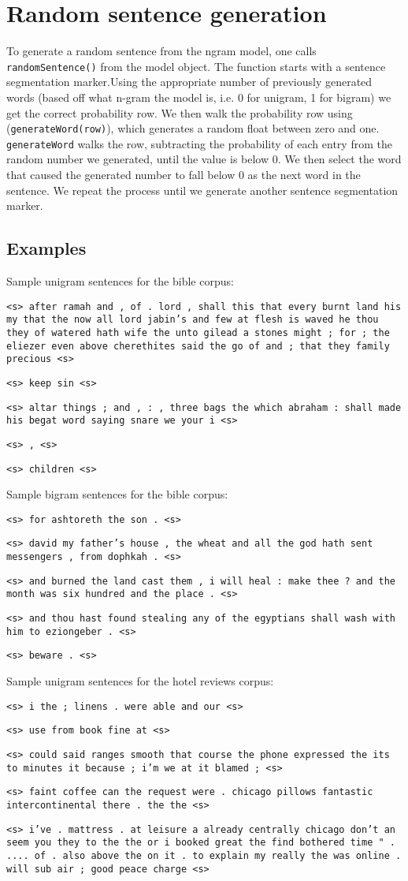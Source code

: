 \documentclass{article}
\begin{document}
\section{Random sentence generation}
To generate a random sentence from the ngram model, one calls \texttt{randomSentence()} from the model object. The function starts with a sentence segmentation marker.Using the appropriate number of previously generated words (based off what n-gram the model is, i.e. 0 for unigram, 1 for bigram) we get the correct probability row. We then walk the probability row using (\texttt{generateWord(row)}), which generates a random float between zero and one. \texttt{generateWord} walks the row, subtracting the probability of each entry from the random number we generated, until the value is below 0. We then select the word that caused the generated number to fall below 0 as the next word in the sentence. We repeat the process until we generate another sentence segmentation marker.

\iffalse
\subsection{Examples}
\setlength{\parindent}{0cm}
\newcommand\npar{\par\smallskip}
Sample unigram sentences for the bible corpus:\npar
\texttt{<s> after ramah and , of . lord , shall this that every burnt land his my that the now all lord jabin's and few at flesh is waved he thou they of watered hath wife the unto gilead a stones might ; for ; the eliezer even above cherethites said the go of and ; that they family precious <s>}\npar
\texttt{<s> keep sin <s>}\npar
\texttt{<s> altar things ; and , : , three bags the which abraham : shall made his begat word saying snare we your i <s>}\npar
\texttt{<s> , <s>}\npar
\texttt{<s> children <s>}\npar
\bigskip

Sample bigram sentences for the bible corpus:\npar
\texttt{<s> for ashtoreth the son . <s>}\npar
\texttt{<s> david my father's house , the wheat and all the god hath sent messengers , from dophkah . <s>}\npar
\texttt{<s> and burned the land cast them , i will heal : make thee ? and the month was six hundred and the place . <s>}\npar
\texttt{<s> and thou hast found stealing any of the egyptians shall wash with him to eziongeber . <s>}\npar
\texttt{<s> beware . <s>}\npar
\bigskip

Sample unigram sentences for the hotel reviews corpus:\npar
\texttt{<s> i the ; linens . were able and our <s>}\npar
\texttt{<s> use from book fine at <s>}\npar
\texttt{<s> could said ranges smooth that course the phone expressed the its to minutes it because ; i'm we at it blamed ; <s>}\npar
\texttt{<s> faint coffee can the request were . chicago pillows fantastic intercontinental there . the the <s>}\npar
\texttt{<s> i've . mattress . at leisure a already centrally chicago don't an seem you they to the the or i booked great the find bothered time " . .... of . also above the on it . to explain my really the was online . will sub air ; good peace charge <s>}\npar
\bigskip
\end{document}
